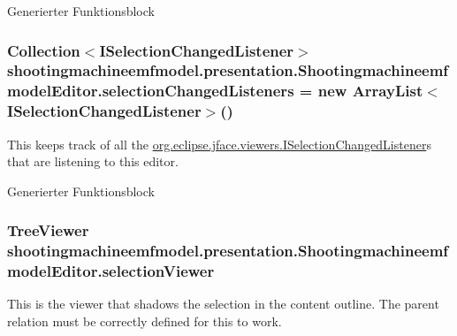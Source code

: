 Generierter Funktionsblock \hypertarget{classshootingmachineemfmodel_1_1presentation_1_1_shootingmachineemfmodel_editor_a602d525f2c28d51f817df019baad462c}{
\subsubsection[{selection\-Changed\-Listeners}]{\setlength{\rightskip}{0pt plus 5cm}Collection$<$I\-Selection\-Changed\-Listener$>$ shootingmachineemfmodel.\-presentation.\-Shootingmachineemfmodel\-Editor.\-selection\-Changed\-Listeners = new Array\-List$<$I\-Selection\-Changed\-Listener$>$()\hspace{0.3cm}{\ttfamily [protected]}}}\label{classshootingmachineemfmodel_1_1presentation_1_1_shootingmachineemfmodel_editor_a602d525f2c28d51f817df019baad462c}
This keeps track of all the \hyperlink{}{org.\-eclipse.\-jface.\-viewers.\-I\-Selection\-Changed\-Listener}s that are listening to this editor.

Generierter Funktionsblock \hypertarget{classshootingmachineemfmodel_1_1presentation_1_1_shootingmachineemfmodel_editor_a3523d857d193e1f6354d231f13ee9407}{
\subsubsection[{selection\-Viewer}]{\setlength{\rightskip}{0pt plus 5cm}Tree\-Viewer shootingmachineemfmodel.\-presentation.\-Shootingmachineemfmodel\-Editor.\-selection\-Viewer\hspace{0.3cm}{\ttfamily [protected]}}}\label{classshootingmachineemfmodel_1_1presentation_1_1_shootingmachineemfmodel_editor_a3523d857d193e1f6354d231f13ee9407}
This is the viewer that shadows the selection in the content outline. The parent relation must be correctly defined for this to work.

